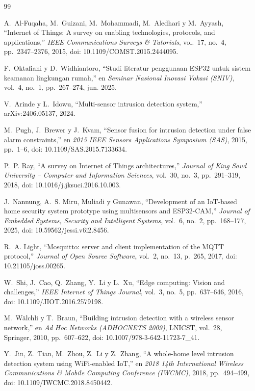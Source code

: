 \documentclass[conference]{IEEEtran}
\begin{document}
\begin{thebibliography}{99}

A.~Al-Fuqaha, M.~Guizani, M.~Mohammadi, M.~Aledhari y M.~Ayyash, ``Internet of Things: A survey on enabling technologies, protocols, and applications,'' \emph{IEEE Communications Surveys \& Tutorials}, vol.~17, no.~4, pp.~2347--2376, 2015, doi: 10.1109/COMST.2015.2444095.

F.~Oktafiani y D.~Widhiantoro, ``Studi literatur penggunaan ESP32 untuk sistem keamanan lingkungan rumah,'' en \emph{Seminar Nasional Inovasi Vokasi (SNIV)}, vol.~4, no.~1, pp.~267--274, jun. 2025.

V.~Arinde y L.~Idowu, ``Multi-sensor intrusion detection system,'' arXiv:2406.05137, 2024.

M.~Pugh, J.~Brewer y J.~Kvam, ``Sensor fusion for intrusion detection under false alarm constraints,'' en \emph{2015 IEEE Sensors Applications Symposium (SAS)}, 2015, pp.~1--6, doi: 10.1109/SAS.2015.7133634.

P.~P. Ray, ``A survey on Internet of Things architectures,'' \emph{Journal of King Saud University -- Computer and Information Sciences}, vol.~30, no.~3, pp.~291--319, 2018, doi: 10.1016/j.jksuci.2016.10.003.

J.~Nannung, A.~S. Miru, Muliadi y Gunawan, ``Development of an IoT-based home security system prototype using multisensors and ESP32-CAM,'' \emph{Journal of Embedded Systems, Security and Intelligent Systems}, vol.~6, no.~2, pp.~168--177, 2025, doi: 10.59562/jessi.v6i2.8456.

R.~A. Light, ``Mosquitto: server and client implementation of the MQTT protocol,'' \emph{Journal of Open Source Software}, vol.~2, no.~13, p.~265, 2017, doi: 10.21105/joss.00265.

W.~Shi, J.~Cao, Q.~Zhang, Y.~Li y L.~Xu, ``Edge computing: Vision and challenges,'' \emph{IEEE Internet of Things Journal}, vol.~3, no.~5, pp.~637--646, 2016, doi: 10.1109/JIOT.2016.2579198.

M.~Wälchli y T.~Braun, ``Building intrusion detection with a wireless sensor network,'' en \emph{Ad Hoc Networks (ADHOCNETS 2009)}, LNICST, vol.~28, Springer, 2010, pp.~607--622, doi: 10.1007/978-3-642-11723-7\_41.

Y.~Jin, Z.~Tian, M.~Zhou, Z.~Li y Z.~Zhang, ``A whole-home level intrusion detection system using WiFi-enabled IoT,'' en \emph{2018 14th International Wireless Communications \& Mobile Computing Conference (IWCMC)}, 2018, pp.~494--499, doi: 10.1109/IWCMC.2018.8450442.

\end{thebibliography}
\end{document}
